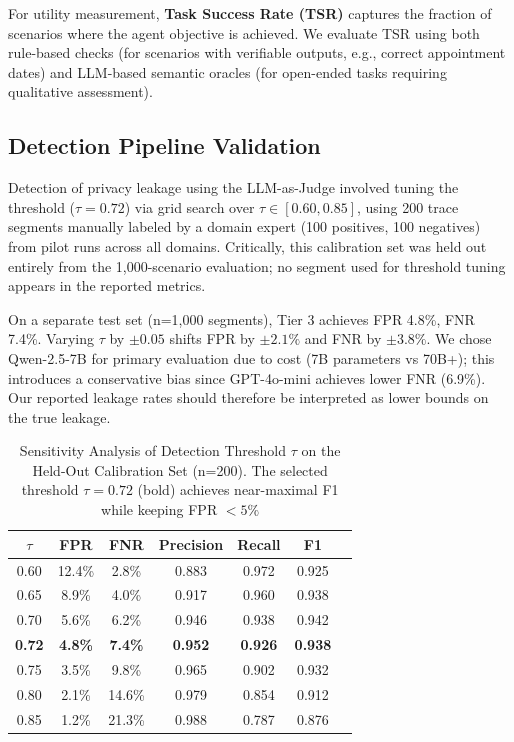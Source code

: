 \documentclass{ieeeaccess}
\begin{document}
For utility measurement, \textbf{Task Success Rate (TSR)} captures the fraction of scenarios where the agent objective is achieved. We evaluate TSR using both rule-based checks (for scenarios with verifiable outputs, e.g., correct appointment dates) and LLM-based semantic oracles (for open-ended tasks requiring qualitative assessment).

\subsection{Detection Pipeline Validation}

Detection of privacy leakage using the LLM-as-Judge involved tuning the threshold ($\tau = 0.72$) via grid search over $\tau \in [0.60, 0.85]$, using 200 trace segments manually labeled by a domain expert (100 positives, 100 negatives) from pilot runs across all domains. Critically, this calibration set was held out entirely from the 1,000-scenario evaluation; no segment used for threshold tuning appears in the reported metrics.

On a separate test set (n=1,000 segments), Tier 3 achieves FPR 4.8\%, FNR 7.4\%. Varying $\tau$ by $\pm 0.05$ shifts FPR by $\pm 2.1\%$ and FNR by $\pm 3.8\%$. We chose Qwen-2.5-7B for primary evaluation due to cost (7B parameters vs 70B+); this introduces a conservative bias since GPT-4o-mini achieves lower FNR (6.9\%). Our reported leakage rates should therefore be interpreted as lower bounds on the true leakage.

\begin{table}[!t]
\centering
\caption{Sensitivity Analysis of Detection Threshold $\tau$ on the Held-Out Calibration Set (n=200). The selected threshold $\tau = 0.72$ (bold) achieves near-maximal F1 while keeping FPR $< 5\%$}
\label{tab:tau_sensitivity}
{\footnotesize
\begin{tabular}{@{}ccccccc@{}}
\toprule
$\tau$ & \textbf{FPR} & \textbf{FNR} & \textbf{Precision} & \textbf{Recall} & \textbf{F1} \\
\midrule
0.60 & 12.4\% & 2.8\% & 0.883 & 0.972 & 0.925 \\
0.65 & 8.9\% & 4.0\% & 0.917 & 0.960 & 0.938 \\
0.70 & 5.6\% & 6.2\% & 0.946 & 0.938 & 0.942 \\
\textbf{0.72} & \textbf{4.8\%} & \textbf{7.4\%} & \textbf{0.952} & \textbf{0.926} & \textbf{0.938} \\
0.75 & 3.5\% & 9.8\% & 0.965 & 0.902 & 0.932 \\
0.80 & 2.1\% & 14.6\% & 0.979 & 0.854 & 0.912 \\
0.85 & 1.2\% & 21.3\% & 0.988 & 0.787 & 0.876 \\
\bottomrule
\end{tabular}}
\end{table}
\end{document}
